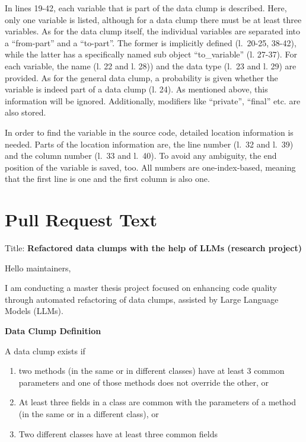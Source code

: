 \begin{appendices}
In lines 19-42, each variable that is part of the data clump is described. Here, only one variable is listed, although for a data clump there must be at least three variables. As for the data clump itself, the individual variables are separated into a \enquote{from-part} and a \enquote{to-part}. The former is implicitly defined (l.~20-25, 38-42), while the latter has a specifically named sub object \enquote{to\_variable} (l. 27-37). For each variable, the name (l. 22 and l. 28)) and the data type (l.~23 and l. 29) are provided. As for the general data clump, a probability is given whether the variable is indeed part of a data clump (l. 24). As mentioned above, this information will be ignored.  Additionally, modifiers like \enquote{private}, \enquote{final} etc. are also stored. 

In order to find the variable in the source code, detailed location information is needed. Parts of the location information are, the line number (l.~32 and l.~39) and the column number (l.~33 and l.~40). To avoid any ambiguity, the end position of the variable is saved, too. All numbers are one-index-based, meaning that the first line is one and the first column is also one. 


\chapter{Pull Request Text} \label{app:pr_text}


Title: \textbf{ Refactored data clumps with the help of LLMs (research project)}


Hello maintainers,

I am conducting a master thesis project focused on enhancing code quality through automated refactoring of data clumps, assisted by Large Language Models (LLMs).\newline


\textbf{Data Clump Definition}
\newline

A data clump exists if
\begin{enumerate}
    \item  two methods (in the same or in different classes) have at least 3 common parameters and one of those methods does not override the other,  or
    \item  At least three fields in a class are common with the parameters of a method (in the same or in a different class), or
    \item  Two different classes have at least three common fields
\end{enumerate}


\end{appendices}
